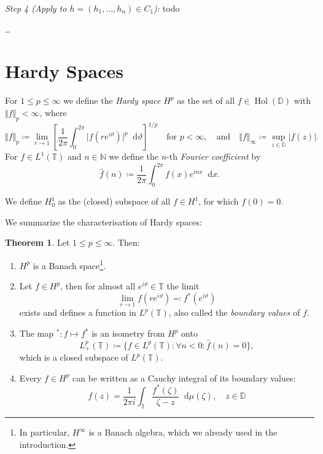 \documentclass[letterpaper, 11pt]{article}
\newcommand{\D}{\mathbb{D}}
\newcommand{\T}{\mathbb{T}}
\newcommand{\N}{\mathbb{N}}
\newcommand{\1}{\mathds{1}}
\newcommand{\diff}{\mathop{}\!\mathrm{d}}
\DeclareMathOperator*{\Hol}{Hol}
\theoremstyle{definition}
\newtheorem{theorem}{Theorem}
\newenvironment{innerproof}
 {\renewcommand{\qedsymbol}{}\proof}
 {\endproof}
\begin{document}
\begin{innerproof}[Proof (continued)]
  \textit{Step 4 (Apply to $h = (h_1, \dots, h_n) \in C_1$):} todo

  \dots

  
\end{innerproof}

\section{Hardy Spaces}

For $1 \leq p \leq \infty$ we define the \emph{Hardy space} $H^p$ as the set of all $f \in \Hol(\D)$ with $\Vert f \Vert_p < \infty$, where
$$ \Vert f \Vert_p \coloneqq \lim_{r \to 1} \left[ \frac{1}{2 \pi} \int_0^{2 \pi} \vert f(r e^{i \vartheta}) \vert^p \diff \vartheta \right]^{1/p} \quad \textrm{for } p < \infty, \quad \textrm{and} \quad \Vert f \Vert_\infty \coloneqq \sup_{z \in \D} \vert f(z) \vert. $$
For $f \in L^1(\T)$ and $n \in \N$ we define the $n$-th \emph{Fourier coefficient} by
$$ \hat{f}(n) \coloneqq \frac{1}{2\pi} \int_0^{2\pi} f(x) e^{i n x} \diff x. $$

We define $H_0^1$ as the (closed) subspace of all $f \in H^1$, for which $f(0) = 0$.

We summarize the characterisation of Hardy spaces:
\begin{theorem} Let $1 \leq p \leq \infty$. Then:
  \begin{enumerate}
    \item $H^p$ is a Banach space\footnote{In particular, $H^\infty$ is a Banach algebra, which we already used in the introduction.}.
    \item Let $f \in H^p$, then for almost all $e^{i \vartheta} \in \T$ the limit
    $$ \lim_{r \to 1} f(re^{i \vartheta}) \eqqcolon f^*(e^{i \vartheta}) $$
    exists and defines a function in $L^p(\T)$, also called the \emph{boundary values} of $f$.
    \item The map ${}^* : f \mapsto f^*$ is an isometry from $H^p$ onto
    $$ L^p_+(\T) \coloneqq \{ f \in L^p(\T) : \forall n < 0: \hat{f}(n) = 0 \}, $$
    which is a closed subspace of $L^p(\T)$.
    \item Every $f \in H^p$ can be written as a Cauchy integral of its boundary values:
    $$ f(z) = \frac{1}{2 \pi i} \int_\T \frac{f^*(\zeta)}{\zeta - z} \diff \mu(\zeta), \quad z \in \D $$
  \end{enumerate}
\end{theorem}
\end{document}
